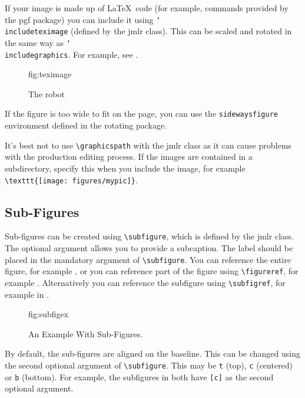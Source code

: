 \documentclass[pmlr]{jmlr}%
\newcommand{\cs}[1]{\texttt{\char`\\#1}}
\begin{document}
If your image is made up of \LaTeX\ code (for example, commands
provided by the \textsf{pgf} package) you can include it using
\cs{includeteximage} (defined by the \textsf{jmlr} class). This
can be scaled and rotated in the same way as \cs{includegraphics}.
For example, see .

\begin{figure}[htbp]
\floatconts
  {fig:teximage}
  {\caption{The robot}}
  {}
\end{figure}

If the figure is too wide to fit on the page, you can use the
\texttt{sidewaysfigure} environment defined in the
\textsf{rotating} package.

It's best not to use \verb|\graphicspath| with the \textsf{jmlr} class
as it can cause problems with the production editing process. If the
images are contained in a subdirectory, specify this when you
include the image, for example \verb|\texttt{[image: figures/mypic]}|.

\subsection{Sub-Figures}
\label{sec:subfigures}

Sub-figures can be created using \verb|\subfigure|, which is
defined by the \textsf{jmlr} class. The optional argument allows
you to provide a subcaption. The label should be placed in the
mandatory argument of \verb|\subfigure|. You can reference the
entire figure, for example , or you can
reference part of the figure using \verb|\figureref|, for example
. Alternatively you can reference the
subfigure using \verb|\subfigref|, for example
 in .

\begin{figure}[htbp]
\floatconts
  {fig:subfigex}
  {\caption{An Example With Sub-Figures.}}
  {%
    \qquad
  }
\end{figure}

By default, the sub-figures are aligned on the baseline.
This can be changed using the second optional argument
of \verb|\subfigure|. This may be \texttt{t} (top), \texttt{c}
(centered) or \texttt{b} (bottom). For example, the subfigures
 in 
both have \verb|[c]| as the second optional argument.
\end{document}
